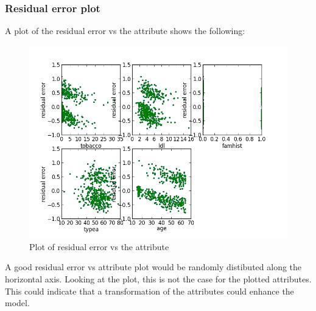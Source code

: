 \subsubsection{Residual error plot}
A plot of the residual error vs the attribute shows the following:
\begin{figure}[H]
\centering
\includegraphics[width=12cm, keepaspectratio=true]{pictures/residual_error.png}
\caption{Plot of residual error vs the attribute}
\label{residualError}
\end{figure}
A good residual error vs attribute plot would be randomly distibuted along the horizontal axis. Looking at the plot, this is not the case for the plotted attributes. This could indicate that a transformation of the attributes could enhance the model.